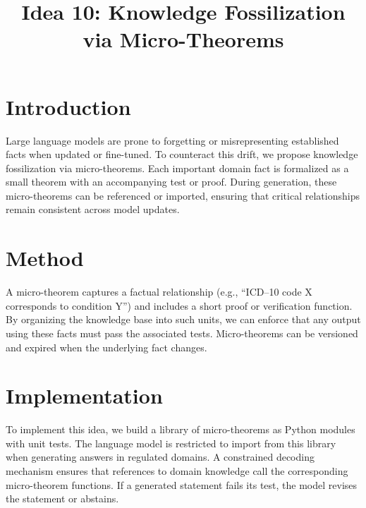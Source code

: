 \documentclass{article}
\title{Idea 10: Knowledge Fossilization via Micro-Theorems}
\author{}
\date{}
\begin{document}
\maketitle

\section{Introduction}
Large language models are prone to forgetting or misrepresenting established facts when updated or fine-tuned. To counteract this drift, we propose knowledge fossilization via micro-theorems. Each important domain fact is formalized as a small theorem with an accompanying test or proof. During generation, these micro-theorems can be referenced or imported, ensuring that critical relationships remain consistent across model updates.

\section{Method}
A micro-theorem captures a factual relationship (e.g., ``ICD--10 code X corresponds to condition Y'') and includes a short proof or verification function. By organizing the knowledge base into such units, we can enforce that any output using these facts must pass the associated tests. Micro-theorems can be versioned and expired when the underlying fact changes.

\section{Implementation}
To implement this idea, we build a library of micro-theorems as Python modules with unit tests. The language model is restricted to import from this library when generating answers in regulated domains. A constrained decoding mechanism ensures that references to domain knowledge call the corresponding micro-theorem functions. If a generated statement fails its test, the model revises the statement or abstains.
\end{document}
